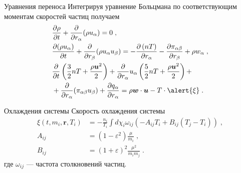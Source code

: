 \documentclass[10pt]{beamer}
\newcommand{\pd}{\partial}
\newcommand{\br}{\bm{r}}
\newcommand{\bu}{\bm{u}}
\newcommand{\bw}{\bm{w}}
\newcommand{\eps}{\varepsilon}
\newcommand{\ab}{\alpha\beta}
\begin{document}
\begin{frame}[fragile]{Уравнения переноса}
  Интегрируя уравнение Больцмана по соответствующим моментам скоростей частиц получаем
  \begin{equation}
    \begin{split}
      &\frac{\pd\rho}{\pd t}+\frac{\pd}{\pd r_{\alpha}}(\rho u_{\alpha})=0\;,\\
      &\frac{\pd(\rho u_\alpha)}{\pd t} + \frac{\pd}{\pd r_\beta}(\rho u_\alpha u_\beta) = 
  -\frac{\pd\left(nT\right)}{\pd r_\alpha} - \frac{\pd\pi_{\ab}}{\pd r_\beta} + \rho w_\alpha\;,\\
  &\frac{\pd}{\pd t}\left(\frac{3}{2}nT+\frac{\rho\bu^2}{2}\right)+
  \frac{\pd}{\pd r_\alpha}u_\alpha\left(\frac{5}{2}nT+\frac{\rho\bu^2}{2}\right)+\\
  &+\frac{\pd}{\pd r_\alpha}(\pi_{\ab}u_\beta)
  +\frac{\pd q_\alpha}{\pd r_\alpha}=\rho\bw\cdot\bu-T\cdot\alert{\xi}\;.
    \end{split}
  \end{equation}

\end{frame}

\begin{frame}[fragile]{Охлаждения системы}
  Скорость охлаждения системы 
  \begin{equation}
  \begin{split}
    \xi(t,m_i,\br,T_i)&=-\frac{n_i}{T_i}\int d\chi_i \omega_{ij}(-A_{ij}T_i+B_{ij}(T_j-T_i))\;,\\
    A_{ij} &= \left(1-\eps^2\right)\frac{\mu}{m_i}\;,\\
    B_{ij} &= \left(1+\eps\right)^2\frac{\mu^2}{m_im_j}\;.
  \end{split}
  \end{equation}
  где $\omega_{ij}$ --- частота столкновений частиц. 

\end{frame}
\end{document}
